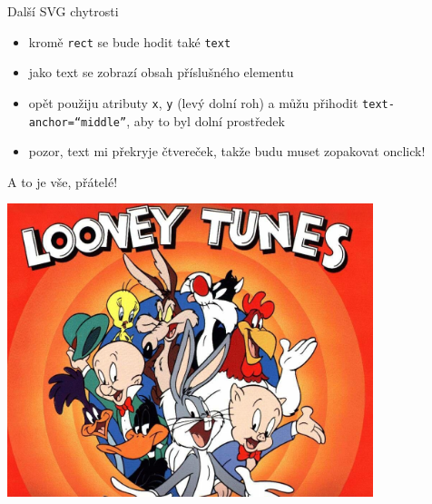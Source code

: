 \documentclass{beamer}
\begin{document}
\begin{frame}{Další SVG chytrosti}
  \begin{itemize}
    \item kromě \texttt{rect} se bude hodit také \texttt{text}
    \item jako text se zobrazí obsah příslušného elementu
    \item opět použiju atributy \texttt{x}, \texttt{y} (levý dolní roh) a můžu přihodit \texttt{text-anchor=``middle''}, aby to byl dolní prostředek
    \item pozor, text mi překryje čtvereček, takže budu muset zopakovat onclick!
  \end{itemize}
\end{frame}


\begin{frame}{A to je vše, přátelé!}
  \begin{center}
    \includegraphics[width=0.8\textwidth]{looney_tunes}
  \end{center}
\end{frame}
\end{document}
